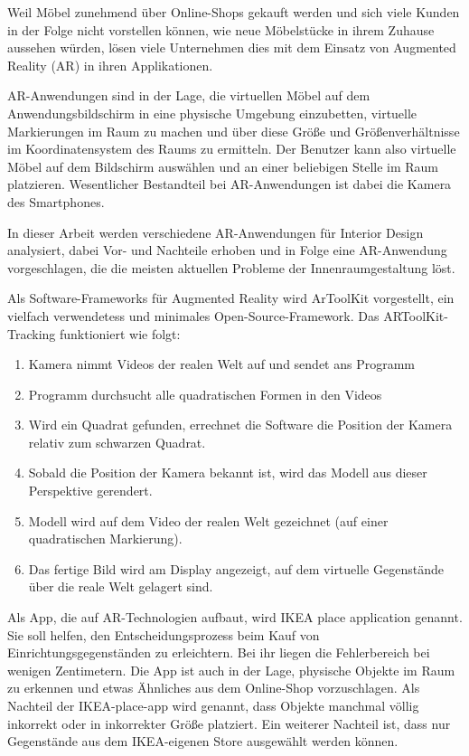 \documentclass[12pt,paper=a4,oneside,hidelinks,headings=small,captions=heading,captions=nooneline]{scrartcl}
\begin{document}
Weil Möbel zunehmend über Online-Shops gekauft werden und sich viele
Kunden in der Folge nicht vorstellen können, wie neue Möbelstücke in
ihrem Zuhause aussehen würden, lösen viele Unternehmen dies mit dem
Einsatz von Augmented Reality (AR) in ihren Applikationen.

AR-Anwendungen sind in der Lage, die virtuellen Möbel auf dem
Anwendungsbildschirm in eine physische Umgebung einzubetten, virtuelle
Markierungen im Raum zu machen und über diese Größe und
Größenverhältnisse im Koordinatensystem des Raums zu ermitteln. Der
Benutzer kann also virtuelle Möbel auf dem Bildschirm auswählen und an
einer beliebigen Stelle im Raum platzieren. Wesentlicher Bestandteil
bei AR-Anwendungen ist dabei die Kamera des Smartphones.

In dieser Arbeit werden verschiedene AR-Anwendungen für Interior
Design analysiert, dabei Vor- und Nachteile erhoben und in Folge eine
AR-Anwendung vorgeschlagen, die die meisten aktuellen Probleme der
Innenraumgestaltung löst.

Als Software-Frameworks für Augmented Reality wird ArToolKit
vorgestellt, ein vielfach verwendetess und minimales
Open-Source-Framework. Das ARToolKit-Tracking funktioniert wie folgt:

\begin{enumerate}
\item Kamera nimmt Videos der realen Welt auf und sendet ans Programm
\item Programm durchsucht alle quadratischen Formen in den Videos
\item Wird ein Quadrat gefunden, errechnet die Software die Position der
Kamera relativ zum schwarzen Quadrat.
\item Sobald die Position der Kamera bekannt ist, wird das
Modell aus dieser Perspektive gerendert.
\item Modell wird auf dem Video der realen Welt gezeichnet (auf einer
quadratischen Markierung).
\item Das fertige Bild wird am Display angezeigt, auf dem virtuelle
Gegenstände über die reale Welt gelagert sind.
\end{enumerate}

Als App, die auf AR-Technologien aufbaut, wird IKEA place application
genannt. Sie soll helfen, den Entscheidungsprozess beim Kauf von
Einrichtungsgegenständen zu erleichtern. Bei ihr liegen die
Fehlerbereich bei wenigen Zentimetern. Die App ist auch in der Lage,
physische Objekte im Raum zu erkennen und etwas Ähnliches aus dem
Online-Shop vorzuschlagen. Als Nachteil der IKEA-place-app wird
genannt, dass Objekte manchmal völlig inkorrekt oder in inkorrekter
Größe platziert. Ein weiterer Nachteil ist, dass nur Gegenstände aus
dem IKEA-eigenen Store ausgewählt werden können.
\end{document}
